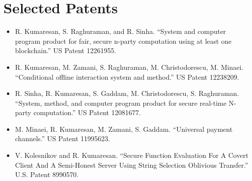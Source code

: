\documentclass[11pt]{article}
\begin{document}
\section{Selected Patents}
\begin{itemize}[leftmargin=*, noitemsep, topsep=0pt]
    \item R. Kumaresan, S. Raghuraman, and R. Sinha. ``System and computer program product for fair, secure n-party computation using at least one blockchain.'' US Patent 12261955.
    \item R. Kumaresan, M. Zamani, S. Raghuraman, M. Christodorescu, M. Minaei. ``Conditional offline interaction system and method.'' US Patent 12238209.
    \item R. Sinha, R. Kumaresan, S. Gaddam, M. Christodorescu, S. Raghuraman. ``System, method, and computer program product for secure real-time N-party computation.'' US Patent 12081677.
    \item M. Minaei, R. Kumaresan, M. Zamani, S. Gaddam. ``Universal payment channels.'' US Patent 11995623.
    \item V. Kolesnikov and R. Kumaresan. ``Secure Function Evaluation For A Covert Client And A Semi-Honest Server Using String Selection Oblivious Transfer.'' U.S. Patent 8990570.
\end{itemize}

\end{document}
